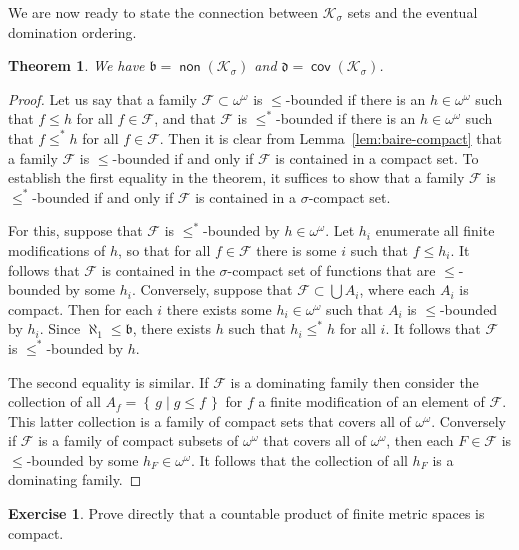 \documentclass[11pt,oneside]{amsbook}
\newcommand{\set}[1]{\left\{\,#1\,\right\}}
\newcommand{\Ksigma}{\mathcal K_\sigma}
\DeclareMathOperator{\non}{\mathsf{non}}
\DeclareMathOperator{\cov}{\mathsf{cov}}
\theoremstyle{definition}
\newtheorem{exerc}{Exercise}[section]
\theoremstyle{plain}
\newtheorem{thm}{Theorem}[section]
\theoremstyle{definition}
\theoremstyle{remark}
\begin{document}
We are now ready to state the connection between $\Ksigma$ sets and the eventual domination ordering.

\begin{thm}
  \label{thm:bd-vs-ksigma}
  We have $\mathfrak b=\non(\Ksigma)$ and $\mathfrak d=\cov(\Ksigma)$.
\end{thm}

\begin{proof}
  Let us say that a family $\mathcal F\subset\omega^\omega$ is $\leq$-bounded if there is an $h\in\omega^\omega$ such that $f\leq h$ for all $f\in\mathcal F$, and that $\mathcal F$ is $\leq^*$-bounded if there is an $h\in\omega^\omega$ such that $f\leq^*h$ for all $f\in\mathcal F$. Then it is clear from Lemma~\ref{lem:baire-compact} that a family $\mathcal F$ is $\leq$-bounded if and only if $\mathcal F$ is contained in a compact set. To establish the first equality in the theorem, it suffices to show that a family $\mathcal F$ is $\leq^*$-bounded if and only if $\mathcal F$ is contained in a $\sigma$-compact set.

  For this, suppose that $\mathcal F$ is $\leq^*$-bounded by $h\in\omega^\omega$. Let $h_i$ enumerate all finite modifications of $h$, so that for all $f\in\mathcal F$ there is some $i$ such that $f\leq h_i$. It follows that $\mathcal F$ is contained in the $\sigma$-compact set of functions that are $\leq$-bounded by some $h_i$. Conversely, suppose that $\mathcal F\subset\bigcup A_i$, where each $A_i$ is compact. Then for each $i$ there exists some $h_i\in\omega^\omega$ such that $A_i$ is $\leq$-bounded by $h_i$. Since $\aleph_1\leq\mathfrak b$, there exists $h$ such that $h_i\leq^*h$ for all $i$. It follows that $\mathcal F$ is $\leq^*$-bounded by $h$.

  The second equality is similar. If $\mathcal F$ is a dominating family then consider the collection of all $A_f=\set{g\mid g\leq f}$ for $f$ a finite modification of an element of $\mathcal F$. This latter collection is a family of compact sets that covers all of $\omega^\omega$. Conversely if $\mathcal F$ is a family of compact subsets of $\omega^\omega$ that covers all of $\omega^\omega$, then each $F\in\mathcal F$ is $\leq$-bounded by some $h_F\in\omega^\omega$. It follows that the collection of all $h_F$ is a dominating family.
\end{proof}

\begin{exerc}
  Prove directly that a countable product of finite metric spaces is compact.
\end{exerc}
\end{document}
